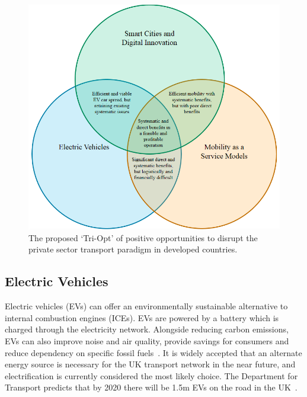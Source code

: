 \documentclass[journal]{IEEEtran}
\begin{document}
\begin{figure}[!htb]
\centering
\includegraphics[width=\columnwidth]{images/triopt.png}
\caption{The proposed `Tri-Opt' of positive opportunities to disrupt
  the private sector transport paradigm in developed countries.}
\label{fig:triopt}
\end{figure}



\subsection{Electric Vehicles}

Electric vehicles (EVs) can offer an environmentally sustainable
alternative to internal combustion engines (ICEs). EVs are powered by
a battery which is charged through the electricity network. Alongside
reducing carbon emissions, EVs can also improve noise and air quality,
provide savings for consumers and reduce dependency on specific fossil
fuels~\cite{postevs:2010}. It is widely accepted that an alternate
energy source is necessary for the UK transport network in the near
future, and electrification is currently considered the most likely
choice. The Department for Transport predicts that by 2020 there will
be 1.5m EVs on the road in the UK~\cite{dft:2008}.
\end{document}
